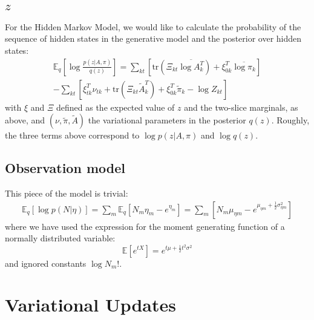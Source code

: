 \documentclass[11pt]{article}
\begin{document}
\subsection{$z$}
For the Hidden Markov Model, we would like to calculate the probability of the sequence of hidden states in the generative model and the posterior over hidden states:
\begin{multline}
    \label{obsmodel}
    \mathbb{E}_q \left[ \log \frac{p(z|A, \pi)}{q(z)} \right] =
    \sum_{kt}  \left[\mathrm{tr}\left(\Xi_{kt} \overline{\log A_k^T}\right) + \xi_{0k}^T \overline{\log \pi_k} \right] \\
    - \sum_{kt} \left[ \xi_{tk}^T \nu_{tk} + \mathrm{tr}\left(\Xi_{kt} \tilde{A}_k^T\right) + \xi_{0k}^T \tilde{\pi}_k - \log Z_{kt} \right]
\end{multline}
with $\xi$ and $\Xi$ defined as the expected value of $z$ and the two-slice marginals, as above, and $(\nu, \tilde{\pi}, \tilde{A})$ the variational parameters in the posterior $q(z)$. Roughly, the three terms above correspond to $\log p(z|A, \pi)$ and $\log q(z)$.

\subsection{Observation model}
This piece of the model is trivial:
\begin{multline}
    \mathbb{E}_q \left[ \log p(N|\eta) \right] = 
    \sum_m \mathbb{E}_q \left[ N_m \eta_m - e^{\eta_m} \right] = 
    \sum_m \left[N_m \mu_{\eta m} - e^{\mu_{\eta m} + \frac{1}{2} \sigma^2_{\eta m}} \right]
\end{multline}
where we have used the expression for the moment generating function of a normally distributed variable:
\begin{equation}
    \mathbb{E}[e^{tX}] = e^{t\mu + \frac{1}{2} t^2\sigma^2}
\end{equation}
and ignored constants $\log N_m!$.


\section{Variational Updates}
\end{document}
